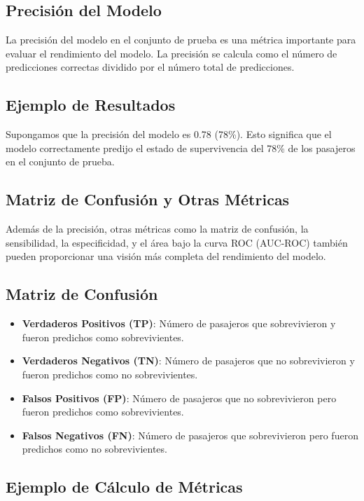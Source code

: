 \subsection*{Precisión del Modelo}

La precisión del modelo en el conjunto de prueba es una métrica importante para evaluar el rendimiento del modelo. La precisión se calcula como el número de predicciones correctas dividido por el número total de predicciones.

\subsection*{Ejemplo de Resultados}

Supongamos que la precisión del modelo es 0.78 (78\%). Esto significa que el modelo correctamente predijo el estado de supervivencia del 78\% de los pasajeros en el conjunto de prueba.

\subsection*{Matriz de Confusión y Otras Métricas}

Además de la precisión, otras métricas como la matriz de confusión, la sensibilidad, la especificidad, y el área bajo la curva ROC (AUC-ROC) también pueden proporcionar una visión más completa del rendimiento del modelo.

\subsection*{Matriz de Confusión}

\begin{itemize}
    \item \textbf{Verdaderos Positivos (TP)}: Número de pasajeros que sobrevivieron y fueron predichos como sobrevivientes.
    \item \textbf{Verdaderos Negativos (TN)}: Número de pasajeros que no sobrevivieron y fueron predichos como no sobrevivientes.
    \item \textbf{Falsos Positivos (FP)}: Número de pasajeros que no sobrevivieron pero fueron predichos como sobrevivientes.
    \item \textbf{Falsos Negativos (FN)}: Número de pasajeros que sobrevivieron pero fueron predichos como no sobrevivientes.
\end{itemize}

\subsection*{Ejemplo de Cálculo de Métricas}

